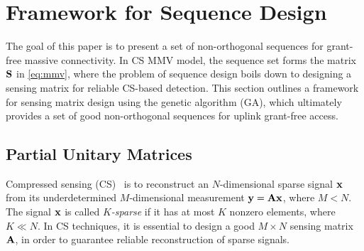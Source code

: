 \documentclass[journal]{IEEEtran}
\newcommand{\xbu}{{\bf x}}
\newcommand{\ybu}{{\bf y}}
\newcommand{\Abu}{{\bf A}}
\newcommand{\Ibu}{{\bf I}}
\newcommand{\Sbu}{{\bf S}}
\newcommand{\Phibu}{{\bf \Phi}}
\newcommand{\Psibu}{{\bf \Psi}}
\numberwithin{const2}{const}
\begin{document}
\section{Framework for Sequence Design}
The goal of this paper is to present a set of non-orthogonal sequences
for grant-free massive connectivity.
In CS MMV model, the sequence set forms the matrix $\Sbu$ in \eqref{eq:mmv}, where
the problem of sequence design
boils down to designing a sensing matrix for reliable CS-based detection.
This section outlines a framework for sensing matrix design using the genetic algorithm (GA),
which ultimately provides a set of good non-orthogonal sequences for uplink grant-free access.

\subsection{Partial Unitary Matrices}

Compressed sensing (CS)~\cite{Eldar:CS} %
is to reconstruct an $N$-dimensional sparse signal $\xbu$
from its underdetermined $M$-dimensional measurement $\ybu = \Abu \xbu$, 
where $M < N$.
The signal $\xbu $ is called \emph{$K$-sparse}
if it has at most $K$ nonzero elements,
where $K \ll N$. 
In CS techniques, it is essential to design a good $M \times N$ sensing matrix $\Abu$,
in order to guarantee reliable reconstruction of sparse signals.
\end{document}
